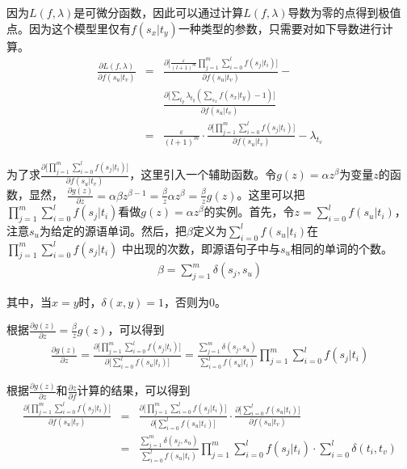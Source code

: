 \noindent 因为$L(f,\lambda)$是可微分函数，因此可以通过计算$L(f,\lambda)$导数为零的点得到极值点。因为这个模型里仅有$f(s_x|t_y)$一种类型的参数，只需要对如下导数进行计算。
\begin{eqnarray}
\frac{\partial L(f,\lambda)}{\partial f(s_u|t_v)}& = & \frac{\partial \big[ \frac{\varepsilon}{(l+1)^{m}} \prod\limits_{j=1}^{m} \sum\limits_{i=0}^{l} f(s_j|t_i) \big]}{\partial f(s_u|t_v)} - \nonumber \\
                                                                     &     & \frac{\partial \big[ \sum_{t_y} \lambda_{t_y} (\sum_{s_x} f(s_x|t_y) -1) \big]}{\partial f(s_u|t_v)} \nonumber \\
                                                                     & =  & \frac{\varepsilon}{(l+1)^{m}} \cdot \frac{\partial \big[ \prod\limits_{j=1}^{m} \sum\limits_{i=0}^{l} f(s_j|t_i) \big]}{\partial f(s_u|t_v)} - \lambda_{t_v}
\label{eq:3-33}
\end{eqnarray}

\parinterval 为了求$\frac{\partial \big[ \prod\limits_{j=1}^{m} \sum\limits_{i=0}^{l} f(s_j|t_i) \big]}{\partial f(s_u|t_v)}$，这里引入一个辅助函数。令$g(z)=\alpha z^{\beta}$为变量$z$的函数，显然，
$\frac{\partial g(z)}{\partial z} = \alpha \beta z^{\beta-1} = \frac{\beta}{z}\alpha z^{\beta} = \frac{\beta}{z} g(z)$。这里可以把$\prod_{j=1}^{m} \sum_{i=0}^{l} f(s_j|t_i)$看做$g(z)=\alpha z^{\beta}$的实例。首先，令$z=\sum_{i=0}^{l}f(s_u|t_i)$，注意$s_u$为给定的源语单词。然后，把$\beta$定义为$\sum_{i=0}^{l}f(s_u|t_i)$在$\prod_{j=1}^{m} \sum_{i=0}^{l} f(s_j|t_i)$ 中出现的次数，即源语句子中与$s_u$相同的单词的个数。
\begin{eqnarray}
\beta=\sum_{j=1}^{m} \delta(s_j,s_u)
\label{eq:3-34}
\end{eqnarray}

\noindent 其中，当$x=y$时，$\delta(x,y)=1$，否则为0。

\parinterval 根据$\frac{\partial g(z)}{\partial z} = \frac{\beta}{z} g(z)$，可以得到
\begin{eqnarray}
\frac{\partial g(z)}{\partial z} = \frac{\partial \big[ \prod\limits_{j=1}^{m} \sum\limits_{i=0}^{l} f(s_j|t_i) \big]}{\partial \big[ \sum\limits_{i=0}^{l}f(s_u|t_i) \big]} = \frac{\sum\limits_{j=1}^{m} \delta(s_j,s_u)}{\sum\limits_{i=0}^{l}f(s_u|t_i)} \prod\limits_{j=1}^{m} \sum\limits_{i=0}^{l} f(s_j|t_i)
\label{eq:3-35}
\end{eqnarray}

\parinterval 根据$\frac{\partial g(z)}{\partial z}$和$\frac{\partial z}{\partial f}$计算的结果，可以得到
\begin{eqnarray}
{\frac{\partial \big[ \prod_{j=1}^{m} \sum_{i=0}^{l} f(s_j|t_i) \big]}{\partial f(s_u|t_v)}}& =& {{\frac{\partial \big[ \prod\limits_{j=1}^{m} \sum\limits_{i=0}^{l} f(s_j|t_i) \big]}{\partial \big[ \sum\limits_{i=0}^{l}f(s_u|t_i) \big]}} \cdot{\frac{\partial \big[ \sum\limits_{i=0}^{l}f(s_u|t_i) \big]}{\partial f(s_u|t_v)}}} \nonumber \\
& = &{\frac{\sum\limits_{j=1}^{m} \delta(s_j,s_u)}{\sum\limits_{i=0}^{l}f(s_u|t_i)} \prod\limits_{j=1}^{m} \sum\limits_{i=0}^{l} f(s_j|t_i) \cdot \sum\limits_{i=0}^{l} \delta(t_i,t_v)}
\label{eq:3-36}
\end{eqnarray}

